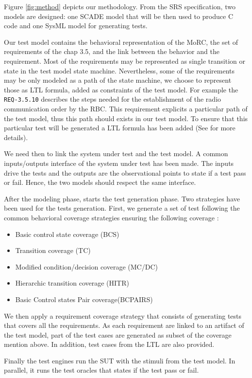 \documentclass{article}
\begin{document}
Figure \ref{fig:method} depicts our methodology. From the SRS
specification, two models are designed: one SCADE model that will
be then  used to produce C code and one SysML model for generating
tests.

Our test model contains the behavioral representation of the MoRC, the
set of requirements of the chap 3.5, and the link between the behavior
and the requirement.  Most of the requirements may be represented as
single transition or state in the test model state
machine. Nevertheless, some of the requirements may be only modeled as
a path of the state machine, we choose to represent those as LTL
formula, added as constraints of the test model. For example the
\verb+REQ-3.5.10+ describes the steps needed for the establishment of
the radio communication order by the RBC. This requirement explicits a
particular path of the test model, thus this path should exists in our
test model. To ensure that this particular test will be generated a LTL
formula has been added (See \cite{braunstein_MorC_2013} for more
details).

We need then to link the system under test and the test model.  A
common inputs/outputs interface of the system under test has been
made. The inputs drive the tests and the outputs are the observational
points to state if a test pass or fail. Hence, the two models should
respect the same interface.

After the modeling phase, starts the test generation phase.
Two strategies have been used for the tests generation. First, we
generate a set of test following the common behavioral coverage
strategies ensuring the following coverage :
\begin{itemize}
\item  Basic control state coverage (BCS)
\item  Transition coverage (TC)
\item  Modified condition/decision coverage (MC/DC)
\item  Hierarchic transition coverage (HITR)
\item  Basic Control states Pair coverage(BCPAIRS)
\end{itemize}
We then apply a requirement coverage strategy that consists of
generating tests that covers all the requirements. As each requirement
are linked to an artifact of the test model, part of the test cases
are generated as subset of the coverage mention above. In addition,
test cases from the LTL are also provided.


Finally the test engines run the SUT with the stimuli from the test
model. In parallel, it runs the test oracles that states if the test
pass or fail.
\end{document}
